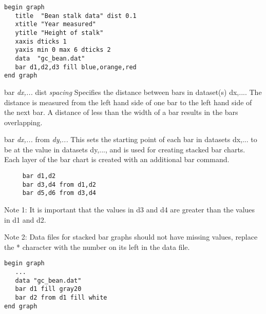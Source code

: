 \begin{minipage}[c]{8cm}
\begin{Verbatim}
begin graph
   title  "Bean stalk data" dist 0.1
   xtitle "Year measured"
   ytitle "Height of stalk"
   xaxis dticks 1
   yaxis min 0 max 6 dticks 2
   data  "gc_bean.dat"
   bar d1,d2,d3 fill blue,orange,red
end graph
\end{Verbatim}
\end{minipage}
\hfill
\begin{minipage}[c]{7cm}
\mbox{}
\end{minipage}

\begin{commanddescription}
\item[{\sf bar {\it dx,...} dist {\it spacing}}]
Specifies the distance between bars in dataset(s) {\sf dx,...}.  The
distance is measured from the left hand side of one bar to the left hand side
of the next bar.  A distance of less than the width of a bar
results in the bars overlapping.

\item[{\sf bar {\it dx,...} from {\it dy,...}}]
This sets the starting point of each bar in datasets {\sf dx,...} to be at
the value in datasets {\sf dy,...}, and is used for creating stacked bar
charts.  Each layer of the bar chart is created with an additional bar command.

\preglecode{}
\begin{Verbatim}
     bar d1,d2
     bar d3,d4 from d1,d2
     bar d5,d6 from d3,d4
\end{Verbatim}
\postglecode{}

Note 1: It is important that the values in d3 and d4 are greater than
the values in d1 and d2.

Note 2: Data files for stacked bar graphs should not have
missing values, replace the * character with the number on its left in the
data file.

\begin{minipage}[c]{8cm}
\begin{Verbatim}
begin graph
   ...
   data "gc_bean.dat"
   bar d1 fill gray20
   bar d2 from d1 fill white
end graph
\end{Verbatim}
\end{minipage}
\hfill
\begin{minipage}[c]{7cm}
\mbox{}
\end{minipage}


\end{commanddescription}
